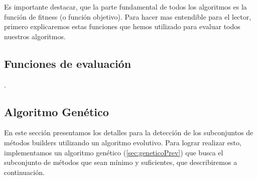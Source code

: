 Es importante destacar, que la parte fundamental de todos los algoritmos es la función de fitness (o función objetivo). Para hacer mas entendible para el lector, primero explicaremos estas funciones que hemos utilizado para evaluar todos nuestros algoritmos.

\subsection{Funciones de evaluación}.

\subsection{Algoritmo Genético}
\label{alg:approachGA}
En este sección presentamos los detalles para la detección de los subconjuntos de métodos builders utilizando un algoritmo evolutivo. Para lograr realizar esto, implementamos un algoritmo genético (\ref{sec:geneticoPrev}) que busca el subconjunto de métodos que sean mínimo y suficientes, que describiremos a continuación.



